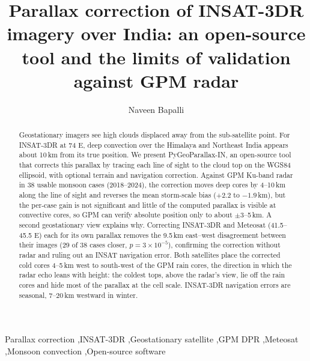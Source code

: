 \documentclass[preprint,12pt,authoryear]{elsarticle}
\begin{document}
\begin{frontmatter}

\title{Parallax correction of INSAT-3DR imagery over India: an open-source tool and the limits of validation against GPM radar}

\author{Naveen Bapalli}

\begin{abstract}
Geostationary imagers see high clouds displaced away from the sub-satellite point. For INSAT-3DR at 74\,\textdegree\,E, deep convection over the Himalaya and Northeast India appears about 10\,km from its true position. We present PyGeoParallax-IN, an open-source tool that corrects this parallax by tracing each line of sight to the cloud top on the WGS84 ellipsoid, with optional terrain and navigation correction. Against GPM Ku-band radar in 38 usable monsoon cases (2018--2024), the correction moves deep cores by 4--10\,km along the line of sight and reverses the mean storm-scale bias ($+2.2$ to $-1.9$\,km), but the per-case gain is not significant and little of the computed parallax is visible at convective cores, so GPM can verify absolute position only to about $\pm$3--5\,km. A second geostationary view explains why. Correcting INSAT-3DR and Meteosat (41.5--45.5\,\textdegree\,E) each for its own parallax removes the 9.5\,km east--west disagreement between their images (29 of 38 cases closer, $p=3\times10^{-5}$), confirming the correction without radar and ruling out an INSAT navigation error. Both satellites place the corrected cold cores 4--5\,km west to south-west of the GPM rain cores, the direction in which the radar echo leans with height: the coldest tops, above the radar's view, lie off the rain cores and hide most of the parallax at the cell scale. INSAT-3DR navigation errors are seasonal, 7--20\,km westward in winter.
\end{abstract}

\begin{keyword}
Parallax correction \sep INSAT-3DR \sep Geostationary satellite \sep GPM DPR \sep Meteosat \sep Monsoon convection \sep Open-source software
\end{keyword}

\end{frontmatter}

\linenumbers










\appendix

\end{document}
